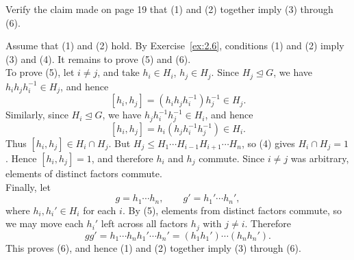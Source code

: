 \documentclass[../Odyssey_Project.tex]{subfiles}
\begin{document}
\begin{exercise}
\label{ex:2.7}
Verify the claim made on page 19 that (1) and (2) together imply (3) through (6).
\end{exercise}
\begin{solution}
    Assume that (1) and (2) hold. By Exercise~\ref{ex:2.6}, conditions (1) and (2) imply (3) and (4). It remains to prove (5) and (6). \\
    To prove (5), let $i \neq j$, and take $h_i \in H_i$, $h_j \in H_j$. Since $H_j \trianglelefteq G$, we have $h_i h_j h_i^{-1} \in H_j$, and hence
    \[
        [h_i,h_j] = (h_i h_j h_i^{-1})h_j^{-1} \in H_j.
    \]
    Similarly, since $H_i \trianglelefteq G$, we have $h_j h_i^{-1}h_j^{-1} \in H_i$, and hence
    \[
        [h_i,h_j] = h_i(h_j h_i^{-1}h_j^{-1}) \in H_i.
    \]
    Thus $[h_i,h_j] \in H_i \cap H_j$. But $H_j \leq H_1\cdots H_{i-1}H_{i+1}\cdots H_n$, so (4) gives $H_i \cap H_j = 1$. Hence $[h_i,h_j] = 1$, and therefore $h_i$ and $h_j$ commute. Since $i \neq j$ was arbitrary, elements of distinct factors commute. \\
    Finally, let
    \[
        g = h_1\cdots h_n,
        \qquad
        g' = h_1'\cdots h_n',
    \]
    where $h_i,h_i' \in H_i$ for each $i$. By (5), elements from distinct factors commute, so we may move each $h_i'$ left across all factors $h_j$ with $j \neq i$. Therefore
    \[
        gg'
        = h_1\cdots h_n h_1'\cdots h_n'
        = (h_1h_1')\cdots(h_nh_n').
    \]
    This proves (6), and hence (1) and (2) together imply (3) through (6).
\end{solution}
\end{document}

